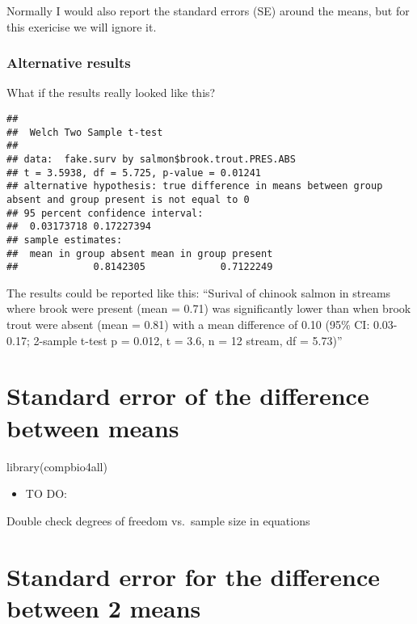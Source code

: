 \documentclass[
]{book}
\newenvironment{Shaded}{\begin{snugshade}}{\end{snugshade}}
\newcommand{\FunctionTok}[1]{\textcolor[rgb]{0.00,0.00,0.00}{#1}}
\newcommand{\NormalTok}[1]{#1}
\providecommand{\tightlist}{%
  \setlength{\itemsep}{0pt}\setlength{\parskip}{0pt}}
\begin{document}
Normally I would also report the standard errors (SE) around the means, but for this exericise we will ignore it.

\hypertarget{alternative-results}{%
\subsection{Alternative results}\label{alternative-results}}

What if the results really looked like this?

\begin{verbatim}
## 
##  Welch Two Sample t-test
## 
## data:  fake.surv by salmon$brook.trout.PRES.ABS
## t = 3.5938, df = 5.725, p-value = 0.01241
## alternative hypothesis: true difference in means between group absent and group present is not equal to 0
## 95 percent confidence interval:
##  0.03173718 0.17227394
## sample estimates:
##  mean in group absent mean in group present 
##             0.8142305             0.7122249
\end{verbatim}

The results could be reported like this:
``Surival of chinook salmon in streams where brook were present (mean = 0.71) was significantly lower than when brook trout were absent (mean = 0.81) with a mean difference of 0.10 (95\% CI: 0.03-0.17; 2-sample t-test p = 0.012, t = 3.6, n = 12 stream, df = 5.73)''

\hypertarget{standard-error-of-the-difference-between-means}{%
\chapter{Standard error of the difference between means}\label{standard-error-of-the-difference-between-means}}

\begin{Shaded}
\begin{Highlighting}[]
\FunctionTok{library}\NormalTok{(compbio4all)}
\end{Highlighting}
\end{Shaded}

\begin{itemize}
\tightlist
\item
  TO DO:
\end{itemize}

Double check degrees of freedom vs.~sample size in equations

\hypertarget{standard-error-for-the-difference-between-2-means}{%
\chapter{Standard error for the difference between 2 means}\label{standard-error-for-the-difference-between-2-means}}
\end{document}
